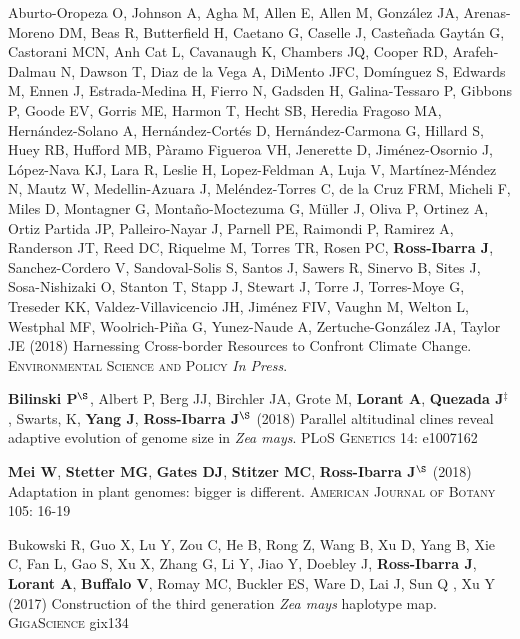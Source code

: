 \documentclass[letterpaper,10pt]{article}
\begin{document}
\begin{etaremune}
\item  Aburto-Oropeza O, Johnson A, Agha M, Allen E,  Allen M,  Gonz\'{a}lez JA, Arenas-Moreno DM, Beas R, Butterfield H, Caetano G, Caselle J, Caste\~{n}ada Gayt\'{a}n G, Castorani MCN, Anh Cat L, Cavanaugh K, Chambers JQ, Cooper RD, Arafeh-Dalmau N, Dawson T, Diaz de la Vega A, DiMento JFC, Dom\'{i}nguez S, Edwards M, Ennen J, Estrada-Medina H, Fierro N, Gadsden H, Galina-Tessaro P, Gibbons P, Goode EV, Gorris ME, Harmon T, Hecht SB, Heredia Fragoso MA, Hern\'{a}ndez-Solano A, Hern\'{a}ndez-Cort\'{e}s D, Hern\'{a}ndez-Carmona G, Hillard S, Huey RB, Hufford MB, P\`{a}ramo Figueroa VH, Jenerette D, Jim\'{e}nez-Osornio J, L\'{o}pez-Nava KJ, Lara R, Leslie H, Lopez-Feldman A, Luja V, Mart\'{i}nez-M\'{e}ndez N, Mautz W, Medellin-Azuara J, Mel\'{e}ndez-Torres C, de la Cruz FRM,  Micheli F, Miles D, Montagner G, Monta\~{n}o-Moctezuma G, M\"{u}ller J, Oliva P, Ortinez A, Ortiz Partida JP, Palleiro-Nayar J, Parnell PE, Raimondi P, Ramirez A, Randerson JT, Reed DC, Riquelme M, Torres TR, Rosen PC, {\bf Ross-Ibarra J}, Sanchez-Cordero V, Sandoval-Solis S, Santos J, Sawers R, Sinervo B, Sites J,  Sosa-Nishizaki O, Stanton T, Stapp J, Stewart J, Torre J,  Torres-Moye G, Treseder KK, Valdez-Villavicencio JH, Jim\'{e}nez FIV, Vaughn M, Welton L, Westphal MF, Woolrich-Pi\~{n}a G,  Yunez-Naude A, Zertuche-Gonz\'{a}lez JA, Taylor JE (2018)
Harnessing Cross-border Resources to Confront Climate Change.  \textsc{Environmental Science and Policy} \textit{In Press}.

\item \textbf{Bilinski P}$^\S$, Albert P, Berg JJ, Birchler JA, Grote M, \textbf{Lorant A}, \textbf{Quezada J}$^\ddagger$, Swarts, K, \textbf{Yang J}, \textbf{Ross-Ibarra J}$^\S$ (2018) Parallel altitudinal clines reveal adaptive evolution of genome size in \textit{Zea mays}. \textsc{PLoS Genetics} 14: e1007162

\item {\bf Mei W}, {\bf Stetter MG}, {\bf Gates DJ}, {\bf Stitzer MC}, {\bf Ross-Ibarra J}$^\S$ (2018) Adaptation in plant genomes: bigger is different.  \textsc{American Journal of Botany} 105: 16-19

\item Bukowski R, Guo X, Lu Y, Zou C, He B, Rong Z, Wang B,  Xu D,  Yang B, Xie C,  Fan L, Gao S, Xu X, Zhang G, Li Y, Jiao Y, Doebley J, {\bf Ross-Ibarra J}, {\bf Lorant A}, {\bf Buffalo V}, Romay MC, Buckler ES, Ware D, Lai J, Sun Q , Xu Y (2017) Construction of the third generation \emph{Zea mays} haplotype map. \textsc{GigaScience} gix134


\end{etaremune}
\end{document}
